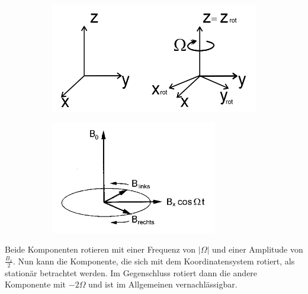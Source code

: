 \begin{figure}[hbtp]
\caption{Rotierendes Koordinatensystem.}
\centering
	\begin{subfigure}[t]{0.4\textwidth}
	\includegraphics[width=\textwidth]{Plots/rotKoordinatensystem.png} 
	\end{subfigure}
	\qquad
	\begin{subfigure}[t]{0.4\textwidth}
	\includegraphics[width=0.8\textwidth]{Plots/B1Felder.png}
	\end{subfigure}
\label{rotKoordi}
\end{figure}
Beide Komponenten rotieren mit einer Frequenz von $|\Omega|$ und einer Amplitude von $\frac{B_x}{2}$.
Nun kann die Komponente, die sich mit dem Koordinatensystem rotiert, als station\"{a}r betrachtet werden.
Im Gegenschluss rotiert dann die andere Komponente mit $-2\Omega$ und ist im Allgemeinen vernachl\"{a}ssigbar.

